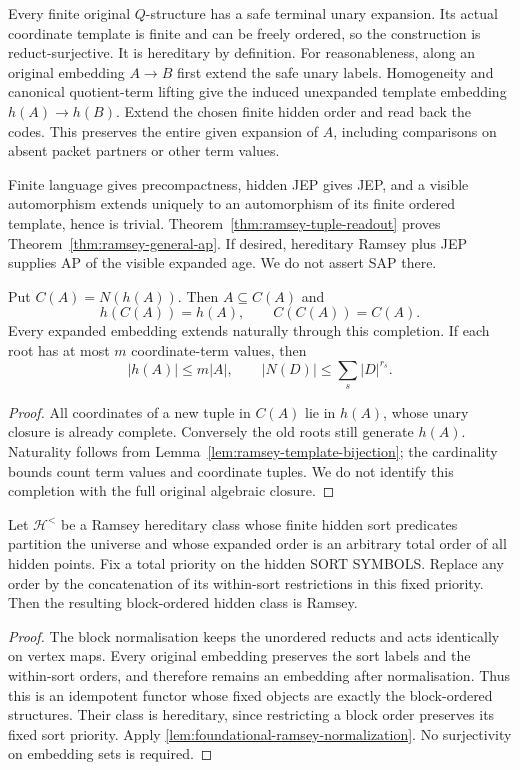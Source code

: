 Every finite original $Q$-structure has a safe terminal unary expansion. Its
actual coordinate template is finite and can be freely ordered, so the
construction is reduct-surjective. It is hereditary by definition. For
reasonableness, along an original embedding $A\to B$ first extend the safe
unary labels. Homogeneity and canonical quotient-term lifting give the
induced unexpanded template embedding $h(A)\to h(B)$. Extend the chosen
finite hidden order and read back the codes. This preserves the entire given
expansion of $A$, including comparisons on absent packet partners or other
term values.

Finite language gives precompactness, hidden JEP gives JEP, and a visible
automorphism extends uniquely to an automorphism of its finite ordered
template, hence is trivial. Theorem~\ref{thm:ramsey-tuple-readout} proves
Theorem~\ref{thm:ramsey-general-ap}. If desired, hereditary Ramsey plus JEP supplies AP of
the visible expanded age. We do not assert SAP there.

\begin{corollary}
Put $C(A)=N(h(A))$. Then $A\subseteq C(A)$ and
\[
                      h(C(A))=h(A),\qquad C(C(A))=C(A).
\]
Every expanded embedding extends naturally through this completion. If each
root has at most $m$ coordinate-term values, then
\[
 |h(A)|\le m|A|,\qquad |N(D)|\le\sum_s|D|^{r_s}.
\]
\end{corollary}
\begin{proof}
All coordinates of a new tuple in $C(A)$ lie in $h(A)$, whose unary closure
is already complete. Conversely the old roots still generate $h(A)$.
Naturality follows from Lemma~\ref{lem:ramsey-template-bijection}; the cardinality bounds count
term values and coordinate tuples. We do not identify this completion with
the full original algebraic closure.
\end{proof}

\begin{lemma}
\label{lem:ramsey-block-retract}
Let $\mathcal H^{<}$ be a Ramsey hereditary class whose finite hidden
sort predicates partition the universe and whose expanded order is an
arbitrary total order of all hidden points. Fix a total priority on the
hidden SORT SYMBOLS. Replace any order by the concatenation of its
within-sort restrictions in this fixed priority. Then the resulting
block-ordered hidden class is Ramsey.
\end{lemma}
\begin{proof}
The block normalisation keeps the unordered reducts and acts identically
on vertex maps. Every original embedding preserves the sort labels and the
within-sort orders, and therefore remains an embedding after
normalisation. Thus this is an idempotent functor whose fixed objects
are exactly the block-ordered structures. Their class is hereditary,
since restricting a block order preserves its fixed sort priority.
Apply \cref{lem:foundational-ramsey-normalization}. No surjectivity on
embedding sets is required.
\end{proof}

